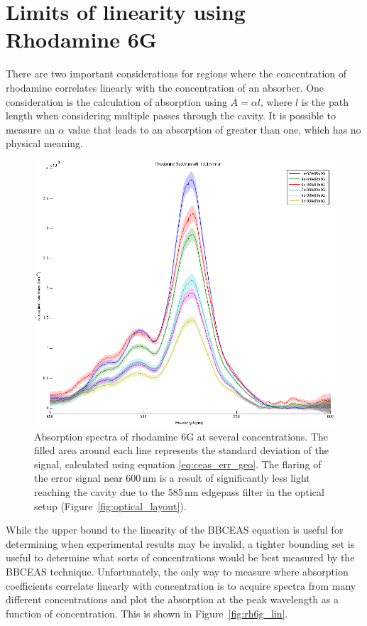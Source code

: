 \section{Limits of linearity using Rhodamine 6G}\label{sec:rhodamine}

There are two important considerations for regions where the concentration of
rhodamine correlates linearly with the concentration of an absorber. One
consideration is the calculation of absorption using $A = \alpha  l$, where $l$
is the path length when considering multiple passes through the cavity.  It is
possible to measure an $\alpha$ value that leads to an absorption of greater
than one, which has no physical meaning.

\begin{figure}
\begin{center}
\includegraphics[width=\textwidth]{figures/Rh6G_absorption_cross_section_with_error}
\end{center}
\caption{Absorption spectra of rhodamine 6G at several concentrations. The filled area around each line represents the standard deviation of the signal, calculated using equation \eqref{eq:ceas_err_geo}. The flaring of the error signal near 600\,nm is a result of significantly less light reaching the cavity due to the 585\,nm edgepass filter in the optical setup (Figure~\ref{fig:optical_layout}).}
\label{fig:rh6g}
\end{figure}


While the upper bound to the linearity of the \ac{BBCEAS} equation is useful
for determining when experimental results may be invalid, a tighter bounding
set is useful to determine what sorts of concentrations would be best
measured by the \ac{BBCEAS} technique. Unfortunately, the only way to measure
where absorption coefficients correlate linearly with concentration is to
acquire spectra from many different concentrations and plot the absorption
at the peak wavelength as a function of concentration. This is shown in
Figure~\ref{fig:rh6g_lin}.

